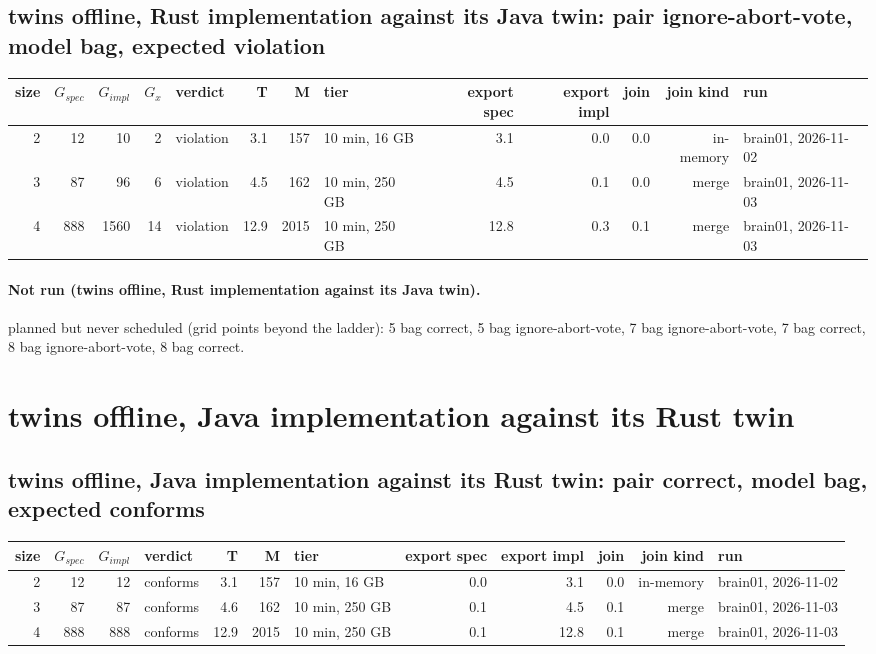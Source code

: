 \documentclass[10pt]{article}
\begin{document}
\subsection*{twins offline, Rust implementation against its Java twin: pair \textsf{ignore-abort-vote}, model bag, expected violation}
\begin{longtable}{@{}rrrrlrrlrrrrl@{}}
\toprule
size & $G_{\mathit{spec}}$ & $G_{\mathit{impl}}$ & $G_x$ & verdict & T & M & tier & export spec & export impl & join & join kind & run \\
\midrule
\endhead
\color{red} 2 & 12 & 10 & 2 & violation & 3.1 & 157 & 10 min, 16 GB & 3.1 & 0.0 & 0.0 & in-memory & brain01, 2026-11-02 \\
\color{blue} 3 & 87 & 96 & 6 & violation & 4.5 & 162 & 10 min, 250 GB & 4.5 & 0.1 & 0.0 & merge & brain01, 2026-11-03 \\
\color{blue} 4 & 888 & 1560 & 14 & violation & 12.9 & 2015 & 10 min, 250 GB & 12.8 & 0.3 & 0.1 & merge & brain01, 2026-11-03 \\
\bottomrule
\end{longtable}
\paragraph{Not run (twins offline, Rust implementation against its Java twin).}
planned but never scheduled (grid points beyond the ladder): 5 bag correct, 5 bag ignore-abort-vote, 7 bag ignore-abort-vote, 7 bag correct, 8 bag ignore-abort-vote, 8 bag correct.\par
\section*{twins offline, Java implementation against its Rust twin}
\subsection*{twins offline, Java implementation against its Rust twin: pair \textsf{correct}, model bag, expected conforms}
\begin{longtable}{@{}rrrlrrlrrrrl@{}}
\toprule
size & $G_{\mathit{spec}}$ & $G_{\mathit{impl}}$ & verdict & T & M & tier & export spec & export impl & join & join kind & run \\
\midrule
\endhead
\color{red} 2 & 12 & 12 & conforms & 3.1 & 157 & 10 min, 16 GB & 0.0 & 3.1 & 0.0 & in-memory & brain01, 2026-11-02 \\
\color{blue} 3 & 87 & 87 & conforms & 4.6 & 162 & 10 min, 250 GB & 0.1 & 4.5 & 0.1 & merge & brain01, 2026-11-03 \\
\color{blue} 4 & 888 & 888 & conforms & 12.9 & 2015 & 10 min, 250 GB & 0.1 & 12.8 & 0.1 & merge & brain01, 2026-11-03 \\
\bottomrule
\end{longtable}
\end{document}

